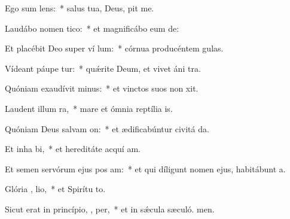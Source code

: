 \item Ego sum   lens:~* salus tua, Deus, pit me.
\item Laudábo nomen   tico:~* et magnificábo eum  de:
\item Et placébit Deo super ví lum:~* córnua producéntem  gulas.
\item Vídeant páupe  tur:~* quǽrite Deum, et vivet áni tra.
\item Quóniam exaudívit  minus:~* et vinctos suos non xit.
\item Laudent illum   ra,~* mare et ómnia reptília  is.
\item Quóniam Deus salvam  on:~* et ædificabúntur civitá da.
\item Et inha bi,~* et hereditáte acquí am.
\item Et semen servórum ejus pos am:~* et qui díligunt nomen ejus, habitábunt  a.
\item Glória ,  lio,~* et Spirítu to.
\item Sicut erat in princípio,  ,  per,~* et in sǽcula sæculó. men.

